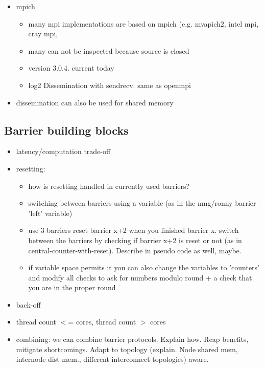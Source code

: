 \documentclass[a4paper, 10pt]{article}
\begin{document}
\begin{itemize}
\begin{itemize}
		\end{itemize}
	\item mpich
		\begin{itemize}
			\item many mpi implementations are based on mpich (e.g. mvapich2, intel mpi, cray mpi,
			\item many can not be inspected because source is closed
			\item version 3.0.4. current today
			\item log2 Dissemination with sendrecv. same as openmpi
		\end{itemize}
	\item dissemination can also be used for shared memory\cite{hoefler2013}
\end{itemize}

\subsection{Barrier building blocks}
\label{ssec:building-blocks}
\begin{itemize}
	\item latency/computation trade-off
	\item resetting:
		\begin{itemize}
			\item how is resetting handled in currently used barriers?
			\item switching between barriers using a variable (as in the nmg/ronny barrier - 'left' variable)
			\item use 3 barriers reset barrier x+2 when you finished barrier x. switch between the barriers by checking if barrier x+2 is reset or not (as in central-counter-with-reset). Describe in pseudo code as well, maybe.
			\item if variable space permits it you can also change the variables to 'counters' and modify all checks to ask for numbers modulo round + a check that you are in the proper round
		\end{itemize}
	\item back-off
	\item thread count $<$= cores, thread count $>$ cores
	\item combining: we can combine barrier protocols. Explain how. Reap benefits, mitigate shortcomings. Adapt to topology (explain. Node shared mem, internode dist mem., different interconnect topologies) aware.
\end{itemize}
\end{document}
